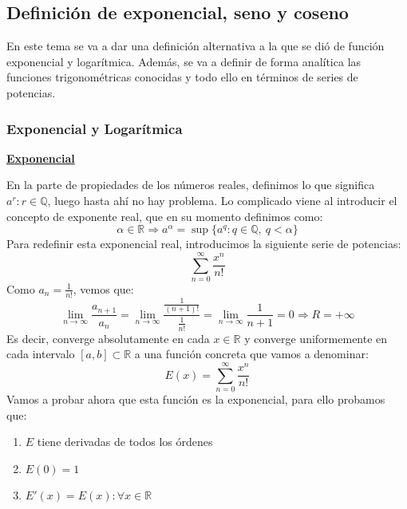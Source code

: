 \documentclass[10pt,a4paper,openright]{book}
\theoremstyle{break}
\begin{document}
\subsection{Definición de exponencial, seno y coseno}
En este tema se va a dar una definición alternativa a la que se dió de función exponencial y logarítmica. Además, se va a definir de forma analítica las funciones trigonométricas conocidas y todo ello en términos de series de potencias.

\subsubsection{Exponencial y Logarítmica}
\underline{\textbf{Exponencial}}

En la parte de propiedades de los números reales, definimos lo que significa $a^r: r\in \mathbb Q$, luego hasta ahí no hay problema. Lo complicado viene al introducir el concepto de exponente real, que en su momento definimos como:
$$\alpha \in \mathbb{R}\Rightarrow a^\alpha = \sup\{a^q : q \in \mathbb{Q} ,\  q < \alpha \}$$
Para redefinir esta exponencial real, introducimos la siguiente serie de potencias:
$$\sum_{n=0}^{\infty} \frac{x^n}{n!}$$
Como $a_n = \frac{1}{n!}$, vemos que:
$$\lim_{n \to \infty} \frac{a_{n+1}}{a_n} = \lim_{n \to \infty} \frac{\frac{1}{(n+1)!}}{\frac{1}{n!}} = \lim_{n \to \infty} \frac{1}{n+1} = 0 \Rightarrow R = +\infty$$
Es decir, converge absolutamente en cada $x \in \mathbb{R}$ y converge uniformemente en cada intervalo $[a,b] \subset \mathbb{R}$ a una función concreta que vamos a denominar: 
$$E(x) = \sum_{n = 0}^{\infty} \frac{x^n}{n!}$$
Vamos a probar ahora que esta función es la exponencial, para ello probamos que:
\begin{enumerate}
\item $E$ tiene derivadas de todos los órdenes
\item $E(0) = 1$
\item $E'(x) = E(x) : \forall x \in \mathbb{R}$
\end{enumerate}
\end{document}
